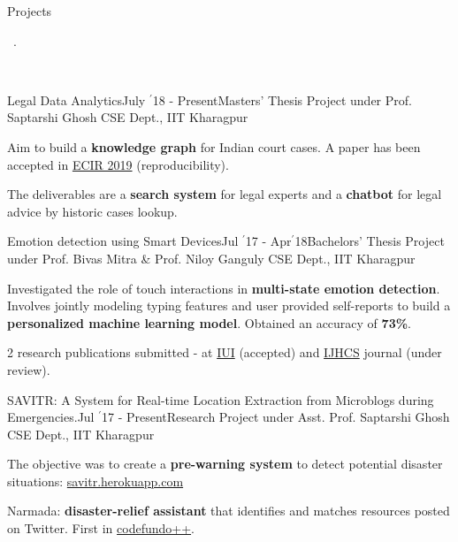 \documentclass[11pt, a4paper]{resume}
\newcommand{\important}[1]{
	\textcolor{mypurple}{#1}
}
\newcommand{\fillit}[1]{
	\leavevmode\xleaders\hbox{#1}\hfill\kern0pt
}
\newcommand{\sectionSubtitleX}[1]{
	\begin{large}
    \important{#1}
    \end{large}
    \fillit{\important{.}}
}
\begin{document}
\sectionSubtitleX{Projects}
\\
\begin{rSubsection}{Legal Data Analytics}{July $^{\prime}$18 - Present}{Masters' Thesis Project under Prof. Saptarshi Ghosh}{\hspace*{\fill} CSE Dept., IIT Kharagpur}
\item Aim to build a {\bf knowledge graph} for Indian court cases. A paper has been accepted in \href{http://ecir2019.org/}{ECIR 2019} (reproducibility). 
\item The deliverables are a {\bf search system} for legal experts and a {\bf chatbot} for legal advice by historic cases lookup.
\end{rSubsection}

\begin{rSubsection}{Emotion detection using Smart Devices}{Jul $^{\prime}$17 - Apr$^{\prime}$18}{Bachelors' Thesis Project under Prof. Bivas Mitra \& Prof. Niloy Ganguly}{\hspace*{\fill} CSE Dept., IIT Kharagpur}
\item Investigated the role of touch interactions in {\bf multi-state emotion detection}. Involves jointly modeling typing features and  user provided self-reports to build a {\bf personalized machine learning model}. Obtained an accuracy of {\bf 73\%}.
\item 2 research publications submitted - at \href{https://iui.acm.org/2019/}{IUI} (accepted) and \href{https://www.journals.elsevier.com/international-journal-of-human-computer-studies}{IJHCS} journal (under review). %
\end{rSubsection}

\begin{rSubsection}{SAVITR: A System for Real-time Location Extraction from Microblogs during Emergencies.}{Jul $^{\prime}$17 - Present}{Research Project under Asst. Prof. Saptarshi Ghosh}{\hspace*{\fill} CSE Dept., IIT Kharagpur}
\item The objective was to create a {\bf pre-warning system} to detect potential disaster situations: \href{http://savitr.herokuapp.com}{savitr.herokuapp.com}
\item Narmada: {\bf disaster-relief assistant} that identifies and matches resources posted on Twitter. First in \href{http://codefundo.io/}{codefundo++}.
\end{rSubsection}
\end{document}
